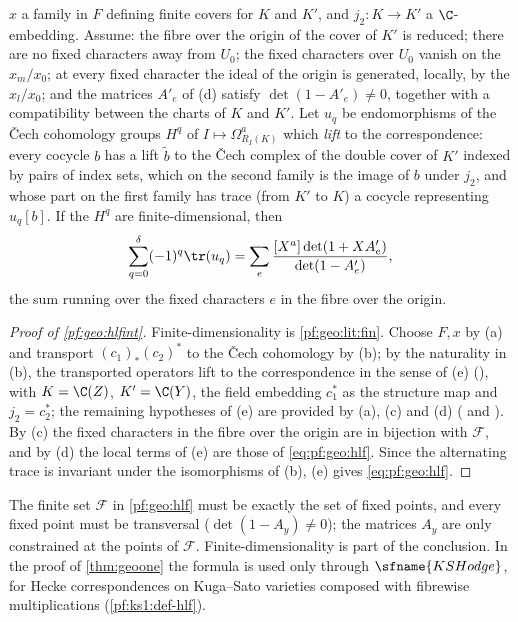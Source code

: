 \begin{enumerate}[label=(\alph*),nosep]
  $x$ a family in $F$ defining finite covers for $K$ and $K'$, and $j_2\colon K\to K'$ a $\C$-embedding. Assume: the fibre over the origin of the
  cover of $K'$ is reduced; there are no fixed characters away from $U_0$; the fixed characters over $U_0$ vanish on the $x_m/x_0$; at every
  fixed character the ideal of the origin is generated, locally, by the $x_l/x_0$; and the matrices $A'_e$ of (d) satisfy
  $\det(1-A'_e)\ne0$, together with a compatibility between the charts of $K$ and $K'$. Let $u_q$ be endomorphisms of the \v{C}ech cohomology
  groups $H^q$ of $I\mapsto\Omega^a_{R_I(K)}$ which \emph{lift} to the correspondence: every cocycle $b$ has a lift $\tilde b$ to the \v{C}ech
  complex of the double cover of $K'$ indexed by pairs of index sets, which on the second family is the image of $b$ under $j_2$, and whose
  part on the first family has trace (from $K'$ to $K$) a cocycle representing $u_q[b]$. If the $H^q$ are finite-dimensional, then
  \[
    \sum_{q=0}^{\delta}(-1)^q\tr(u_q)=\sum_{e}\frac{[X^a]\det(1+XA'_e)}{\det(1-A'_e)},
  \]
  the sum running over the fixed characters $e$ in the fibre over the origin.
\end{enumerate}

\begin{proof}[Proof of \cref{pf:geo:hlfint}]
Finite-dimensionality is \cref{pf:geo:lit:fin}. Choose $F,x$ by (a) and transport $(c_1)_*(c_2)^*$ to the \v{C}ech cohomology by (b); by the
naturality in (b), the transported operators lift to the correspondence in the sense of (e)
(), with $K=\C(Z)$, $K'=\C(Y)$, the field embedding $c_1^*$ as the structure
map and $j_2=c_2^*$; the remaining hypotheses of (e) are provided by (a), (c) and (d)
( and ). By (c) the
fixed characters in the fibre over the origin are in bijection with $\mathcal F$, and by (d) the local terms of (e) are those of
\eqref{eq:pf:geo:hlf}. Since the alternating trace is invariant under the isomorphisms of (b), (e) gives \eqref{eq:pf:geo:hlf}.
\end{proof}

\begin{remark}\label{pf:geo:rem:hlfscope}
The finite set $\mathcal F$ in \cref{pf:geo:hlf} must be exactly the set of fixed points, and every fixed point must be transversal
($\det(1-A_y)\ne0$); the matrices $A_y$ are only constrained at the points of $\mathcal F$. Finite-dimensionality is part of the conclusion. In
the proof of \cref{thm:geoone} the formula is used only through $\sfname{KSHodge}$, for Hecke correspondences on Kuga--Sato varieties
composed with fibrewise multiplications (\cref{pf:ks1:def-hlf}).
\end{remark}

